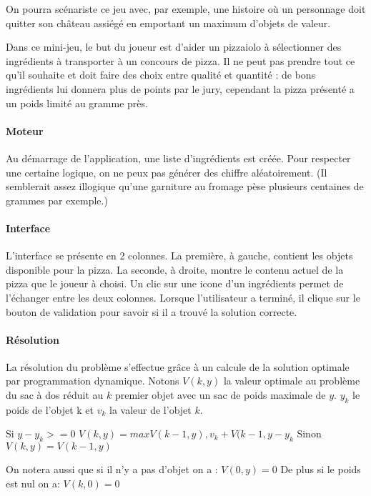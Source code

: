         On pourra scénariste ce jeu avec, par exemple, une histoire où un personnage
        doit quitter son château assiégé en emportant un maximum d'objets de valeur.


            Dans ce mini-jeu, le but du joueur est d'aider un pizzaiolo à
            sélectionner des ingrédients à transporter à un concours de pizza.
            Il ne peut pas prendre tout ce qu'il souhaite et doit faire des
            choix entre qualité et quantité : de bons ingrédients lui donnera
            plus de points par le jury, cependant la pizza présenté a un poids
            limité au gramme près.
        \paragraph{Moteur}
            Au démarrage de l'application, une liste d'ingrédients est créée.
            Pour respecter une certaine logique, on ne peux pas générer des
            chiffre aléatoirement. (Il semblerait assez illogique qu'une
            garniture au fromage pèse plusieurs centaines de grammes par
            exemple.)
        \paragraph{Interface}
            L'interface se présente en 2 colonnes. La première, à gauche,
            contient les objets disponible pour la pizza. La seconde, à droite,
            montre le contenu actuel de la pizza que le joueur à choisi.
            Un clic sur une icone d'un ingrédients permet de l'échanger entre
            les deux colonnes.
            Lorsque l'utilisateur a terminé, il clique sur le bouton de
            validation pour savoir si il a trouvé la solution correcte.
        \paragraph{Résolution}
            La résolution du problème s'effectue grâce à un calcule de la solution optimale 
            par programmation dynamique. Notons $V(k,y)$ la valeur optimale au problème du sac à dos  
            réduit au $k$ premier objet avec un sac de poids maximale de $y$. 
            $y_{k}$ le poids de l'objet k et $v_{k}$ la valeur de l'objet $k$.

            Si $ y - y_{k} >= 0 $
                $V(k,y) = max{ V(k-1,y)  ,v_{k} + V(k-1,y-y_{k}}$
            Sinon
                $V(k,y) = V(k-1,y)$

            On notera aussi que si il n'y a pas d'objet on a : $V(0,y) = 0$
            De plus si le poids est nul on a: $V(k,0) = 0$



